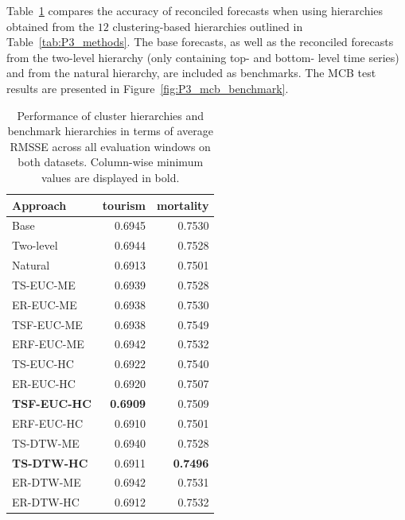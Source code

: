\documentclass[a4paper,review,12pt,authoryear]{elsarticle}
\begin{document}
 
Table~\ref{tab:P3_rmsse} compares the accuracy of reconciled forecasts when using hierarchies obtained from the $12$ clustering-based hierarchies outlined in Table~\ref{tab:P3_methods}. The base forecasts, as well as the reconciled forecasts from the two-level hierarchy (only containing top- and bottom- level time series) and from the natural hierarchy, are included as benchmarks.
The MCB test results are presented in Figure~\ref{fig:P3_mcb_benchmark}.

\begin{table}[h!]
    \centering
\caption{\label{tab:P3_rmsse}Performance of cluster hierarchies and benchmark hierarchies in terms of average RMSSE across all evaluation windows on both datasets. Column-wise minimum values are displayed in bold.}
\begin{tabular}{lrr}\toprule
    Approach & tourism & mortality \\ \midrule
    Base & 0.6945 & 0.7530 \\ 
    Two-level & 0.6944 & 0.7528 \\ 
    Natural & 0.6913 & 0.7501 \\ 
    TS-EUC-ME & 0.6939 & 0.7528 \\ 
    ER-EUC-ME & 0.6938 & 0.7530 \\ 
    TSF-EUC-ME & 0.6938 & 0.7549 \\ 
    ERF-EUC-ME & 0.6942 & 0.7532 \\ 
    TS-EUC-HC & 0.6922 & 0.7540 \\ 
    ER-EUC-HC & 0.6920 & 0.7507 \\ 
    \textbf{TSF-EUC-HC} & \textbf{0.6909} & 0.7509 \\ 
    ERF-EUC-HC & 0.6910 & 0.7501 \\ 
    TS-DTW-ME & 0.6940 & 0.7528 \\ 
    \textbf{TS-DTW-HC} & 0.6911 & \textbf{0.7496} \\ 
    ER-DTW-ME & 0.6942 & 0.7531 \\ 
    ER-DTW-HC & 0.6912 & 0.7532 \\ \bottomrule
\end{tabular}

\end{table}
\end{document}
